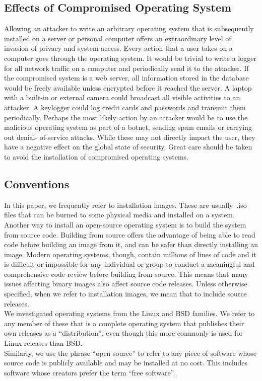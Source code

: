 \documentclass[conference]{IEEEtran}
\begin{document}
\subsection{Effects of Compromised Operating System}

Allowing an attacker to write an arbitrary operating system that is subsequently
installed on a server or personal computer offers an extraordinary level of
invasion of privacy and system access. Every action that a user takes on a
computer goes through the operating system. It would be trivial to write a logger
for all network traffic on a computer and periodically send it to the attacker. If
the compromised system is a web server, all information stored in the database would
be freely available unless encrypted before it reached the server. A laptop with a
built-in or external camera could broadcast all visible activities to an attacker.
A keylogger could log credit cards and passwords and transmit them periodically.
Perhaps the most likely action by an attacker would be to use the malicious
operating system as part of a botnet, sending spam emails or carrying out denial-
of-service attacks. While these may not directly impact the user, they have a
negative effect on the global state of security. Great care should be taken to avoid
the installation of compromised operating systems.

\subsection{Conventions}

In this paper, we frequently refer to installation images. These are usually~.iso
files that can be burned to some physical media and installed on a system. Another
way to install an open-source operating system is to build the system from source
code. Building from source offers the advantage of being able to read code before
building an image from it, and can be safer than directly installing an image.
Modern operating systems, though, contain millions of lines of code and it is
difficult or impossible for any individual or group to conduct a meaningful and
comprehensive code review before building from source. This means that many issues
affecting binary images also affect source code releases. Unless otherwise specified,
when we refer to installation images, we mean that to include source releases.\\
\indent We investigated operating systems from the Linux and BSD families. We refer to any
member of these that is a complete operating system that publishes their own releases
as a ``distribution'', even though this more commonly is used for Linux releases
than BSD.\\
\indent Similarly, we use the phrase ``open source'' to refer to any piece of
software whose source code is publicly available and may be installed at no cost.
This includes software whose creators prefer the term ``free software''.
\end{document}
